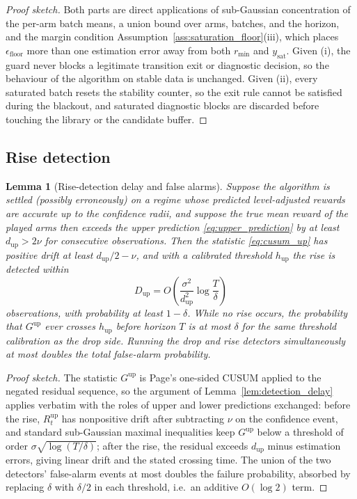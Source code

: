 \documentclass[11pt]{article}
\newtheorem{lemma}{Lemma}
\begin{document}
\begin{proof}[Proof sketch]
Both parts are direct applications of sub-Gaussian concentration of the per-arm batch means, a union bound over arms, batches, and the horizon, and the margin condition Assumption~\ref{ass:saturation_floor}(iii), which places $\epsilon_{\mathrm{floor}}$ more than one estimation error away from both $r_{\min}$ and $y_{\mathrm{sat}}$. Given (i), the guard never blocks a legitimate transition exit or diagnostic decision, so the behaviour of the algorithm on stable data is unchanged. Given (ii), every saturated batch resets the stability counter, so the exit rule cannot be satisfied during the blackout, and saturated diagnostic blocks are discarded before touching the library or the candidate buffer.
\end{proof}

\subsection{Rise detection}
\label{subsec:rise_detection_proof}

\begin{lemma}[Rise-detection delay and false alarms]
\label{lem:rise_detection}
Suppose the algorithm is settled (possibly erroneously) on a regime whose predicted level-adjusted rewards are accurate up to the confidence radii, and suppose the true mean reward of the played arms then exceeds the upper prediction \eqref{eq:upper_prediction} by at least $d_{\mathrm{up}}>2\nu$ for consecutive observations. Then the statistic \eqref{eq:cusum_up} has positive drift at least $d_{\mathrm{up}}/2-\nu$, and with a calibrated threshold $h_{\mathrm{up}}$ the rise is detected within
\begin{equation}
\label{eq:rise_detection_delay}
D_{\mathrm{up}}
=
O\left(
\frac{\sigma^2}{d_{\mathrm{up}}^2}
\log\frac{T}{\delta}
\right)
\end{equation}
observations, with probability at least $1-\delta$. While no rise occurs, the probability that $G^{\mathrm{up}}$ ever crosses $h_{\mathrm{up}}$ before horizon $T$ is at most $\delta$ for the same threshold calibration as the drop side. Running the drop and rise detectors simultaneously at most doubles the total false-alarm probability.
\end{lemma}

\begin{proof}[Proof sketch]
The statistic $G^{\mathrm{up}}$ is Page's one-sided CUSUM applied to the negated residual sequence, so the argument of Lemma~\ref{lem:detection_delay} applies verbatim with the roles of upper and lower predictions exchanged: before the rise, $R_t^{\mathrm{up}}$ has nonpositive drift after subtracting $\nu$ on the confidence event, and standard sub-Gaussian maximal inequalities keep $G^{\mathrm{up}}$ below a threshold of order $\sigma\sqrt{\log(T/\delta)}$; after the rise, the residual exceeds $d_{\mathrm{up}}$ minus estimation errors, giving linear drift and the stated crossing time. The union of the two detectors' false-alarm events at most doubles the failure probability, absorbed by replacing $\delta$ with $\delta/2$ in each threshold, i.e.\ an additive $O(\log 2)$ term.
\end{proof}
\end{document}
